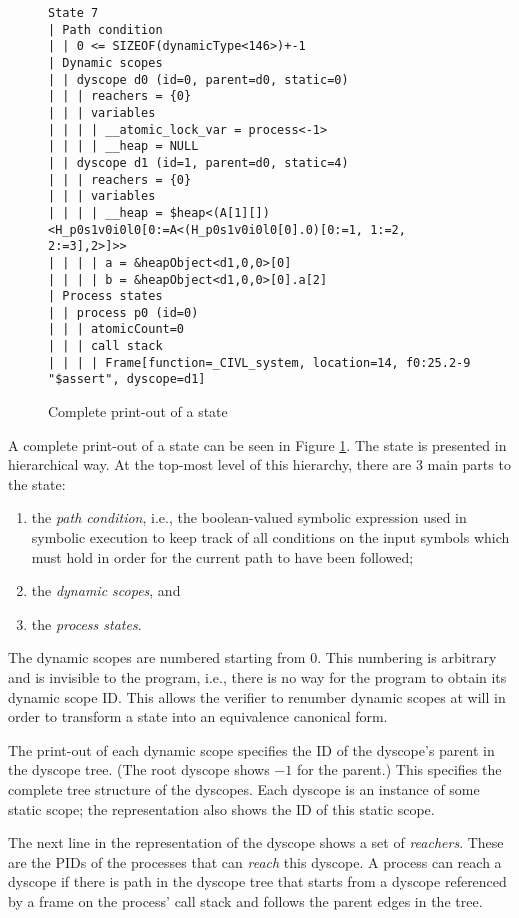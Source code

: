 \begin{figure}
  \begin{small}
\begin{verbatim}
State 7
| Path condition
| | 0 <= SIZEOF(dynamicType<146>)+-1
| Dynamic scopes
| | dyscope d0 (id=0, parent=d0, static=0)
| | | reachers = {0}
| | | variables
| | | | __atomic_lock_var = process<-1>
| | | | __heap = NULL
| | dyscope d1 (id=1, parent=d0, static=4)
| | | reachers = {0}
| | | variables
| | | | __heap = $heap<(A[1][])<H_p0s1v0i0l0[0:=A<(H_p0s1v0i0l0[0].0)[0:=1, 1:=2, 2:=3],2>]>>
| | | | a = &heapObject<d1,0,0>[0]
| | | | b = &heapObject<d1,0,0>[0].a[2]
| Process states
| | process p0 (id=0)
| | | atomicCount=0
| | | call stack
| | | | Frame[function=_CIVL_system, location=14, f0:25.2-9 "$assert", dyscope=d1]
\end{verbatim}
  \end{small}
  \caption{Complete print-out of a state}
  \label{fig:state-print}
\end{figure}

A complete print-out of a state can be seen in Figure
\ref{fig:state-print}.  The state is presented in hierarchical way.
At the top-most level of this hierarchy, there are 3 main parts to the
state:
\begin{enumerate}
\item the \emph{path condition}, i.e., the boolean-valued symbolic
  expression used in symbolic execution to keep track of all
  conditions on the input symbols which must hold in order for the
  current path to have been followed;
\item the \emph{dynamic scopes}, and
\item the \emph{process states}.
\end{enumerate}

The dynamic scopes are numbered starting from 0.  This numbering is
arbitrary and is invisible to the program, i.e., there is no way for
the program to obtain its dynamic scope ID.  This allows the verifier
to renumber dynamic scopes at will in order to transform a state into
an equivalence canonical form.

The print-out of each dynamic scope specifies the ID of the dyscope's
parent in the dyscope tree.  (The root dyscope shows $-1$ for the
parent.)  This specifies the complete tree structure of the dyscopes.
Each dyscope is an instance of some static scope; the representation
also shows the ID of this static scope.

The next line in the representation of the dyscope shows a set of
\emph{reachers}.  These are the PIDs of the processes that can
\emph{reach} this dyscope.  A process can reach a dyscope if there is
path in the dyscope tree that starts from a dyscope referenced by a
frame on the process' call stack and follows the parent edges in the
tree.

